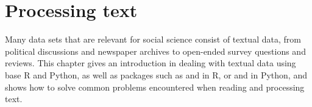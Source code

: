 \chapter{Processing text}
\label{chap:protext}

Many data sets that are relevant for social science consist of textual data, from political discussions and newspaper archives to open-ended survey questions and reviews. This chapter gives an introduction in dealing with textual data using base R and Python, as well as packages such as  and  in R, or  and  in Python, and shows how to solve common problems encountered when reading and processing text. 







